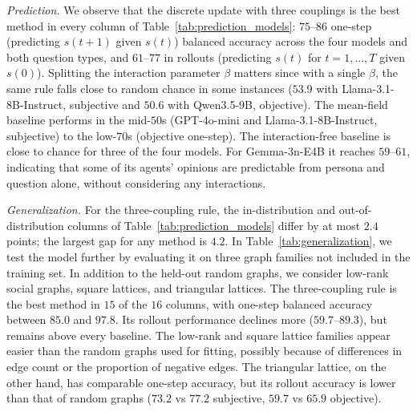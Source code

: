 \textit{Prediction.} We observe that the discrete update with three couplings is the best method in every column of Table~\ref{tab:prediction_models}: $75$--$86$ one-step (predicting $s(t+1)$ given $s(t)$) balanced accuracy across the four models and both question types, and $61$--$77$ in rollouts (predicting $s(t)$ for $t=1,\dots , T$ given $s(0)$). Splitting the interaction parameter $\beta$ matters since with a single $\beta$, the same rule falls close to random chance in some instances  ($53.9$ with Llama-3.1-8B-Instruct, subjective and $50.6$ with Qwen3.5-9B, objective). The mean-field baseline performs in the mid-$50$s (GPT-4o-mini and Llama-3.1-8B-Instruct, subjective) to the low-$70$s (objective one-step). The interaction-free baseline is close to chance for three of the four models. For Gemma-3n-E4B it reaches $59$--$61$, indicating that some of its agents' opinions are predictable from persona and question alone, without considering any interactions.

\textit{Generalization.} For the three-coupling rule, the in-distribution and out-of-distribution columns of Table~\ref{tab:prediction_models} differ by at most $2.4$ points; the largest gap for any method is $4.2$. In Table~\ref{tab:generalization}, we test the model further by evaluating it on three graph families not included in the training set. In addition to the held-out random graphs, we consider low-rank social graphs, square lattices, and triangular lattices. The three-coupling rule is the best method in $15$ of the $16$ columns, with one-step balanced accuracy between $85.0$ and $97.8$. Its rollout performance declines more ($59.7$--$89.3$), but remains above every baseline. The low-rank and square lattice families appear easier than the random graphs used for fitting, possibly because of differences in edge count or the proportion of negative edges. The triangular lattice, on the other hand, has comparable one-step accuracy, but its rollout accuracy is lower than that of random graphs ($73.2$ vs $77.2$ subjective, $59.7$ vs $65.9$ objective).
